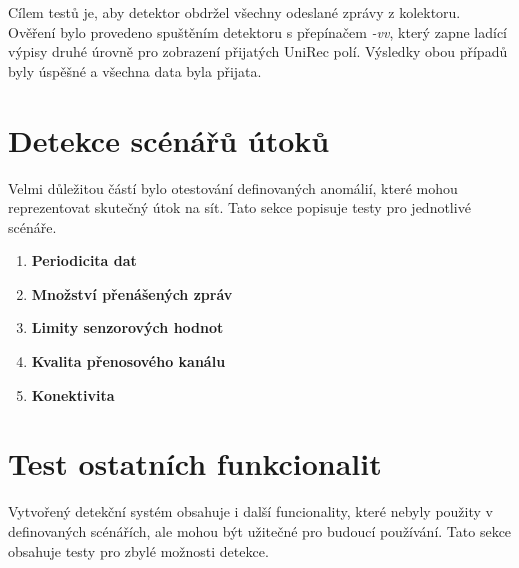 Cílem testů je, aby detektor obdržel všechny odeslané zprávy z kolektoru. Ověření bylo provedeno
spuštěním detektoru s přepínačem \textit{-vv}, který zapne ladící výpisy druhé úrovně pro zobrazení 
přijatých UniRec polí. Výsledky obou případů byly úspěšné a všechna data byla přijata.

\section{Detekce scénářů útoků}
Velmi důležitou částí bylo otestování definovaných anomálií, které mohou reprezentovat skutečný
útok na sít. Tato sekce popisuje testy pro jednotlivé scénáře.

  \begin{enumerate}
    \item \textbf{Periodicita dat}
    \item \textbf{Množství přenášených zpráv}
    \item \textbf{Limity senzorových hodnot}
    \item \textbf{Kvalita přenosového kanálu}
    \item \textbf{Konektivita}
  \end{enumerate}

\section{Test ostatních funkcionalit}
Vytvořený detekční systém obsahuje i další funcionality, které nebyly použity v definovaných scénářích,
ale mohou být užitečné pro budoucí používání. Tato sekce obsahuje testy pro zbylé možnosti
detekce.

